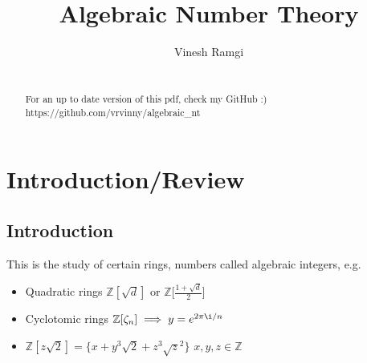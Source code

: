 \documentclass[11pt]{article}
\begin{document}
\newtheorem{theorem}{Theorem}[section]
\newtheorem{defn}[theorem]{Definition}
\newtheorem{prop}[theorem]{Proposition}
\newtheorem{cor}[theorem]{Corollary}
\newtheorem{lemma}[theorem]{Lemma}
\newcommand{\R}{\mathbb{R}}
\newcommand{\Z}{\mathbb{Z}}
\newcommand{\C}{\mathbb{C}}
\newcommand{\Q}{\mathbb{Q}}
\newcommand{\A}{\alpha}
\newcommand{\aaa}{\alpha}
\newcommand{\z}{\zeta}
\newcommand{\ring}{\mathcal{O}}
\newcommand{\spa}{$ $\\[-0.5em]}
\newcommand{\spac}{$ $\\[1em]}
\newcommand{\B}{\beta}
\newcommand{\G}{\gamma}
\newcommand{\bba}{\mathcal{B}}
\newcommand{\dd}{\Delta}
\newcommand{\ttt}{\theta}
\newcommand{\phh}{\varphi}
\newcommand{\ff}{\mathbb{F}}








\title{Algebraic Number Theory}
\author{Vinesh Ramgi}
	\maketitle


\newpage
	\begin{abstract}

		 \\[2em]

		For an up to date version of this pdf, check my GitHub :)\\[0.5em]
https://github.com/vrvinny/algebraic\_nt

	\end{abstract}
\newpage
\tableofcontents{}
\newpage
	\section{Introduction/Review}
	\subsection{Introduction}
		This is the study of certain rings, numbers called algebraic integers, e.g. 
	
	\begin{itemize}
		\item{Quadratic rings $\Z[\sqrt{d}]$ or $\Z [\frac{1+\sqrt{d}}{2}$]}
		\item{Cyclotomic rings $\Z[\zeta_n] \implies y = e^{2\pi \i /n }$}
		\item{$\Z[z\sqrt{2}] = \{ x+y^3\sqrt{2} + z^3 \sqrt{z}^2 \}$ $x,y,z \in \Z$}
	\end{itemize}
\end{document}

